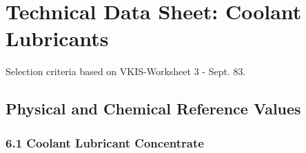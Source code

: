 \section{Technical Data Sheet: Coolant Lubricants}

\setcounter{page}{2}

Selection criteria based on VKIS-Worksheet 3 - Sept. 83.

\subsection*{Physical and Chemical Reference Values}

\subsubsection*{6.1 Coolant Lubricant Concentrate}


